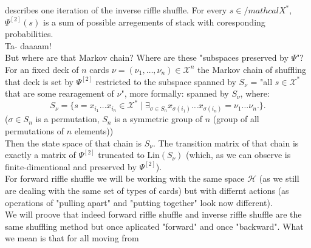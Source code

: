 \documentclass[a4paper]{article}
\begin{document}
describes one iteration of the inverse riffle shuffle. For every $s \in /mathcal{X}^*$, $\Psi^{[2]}(s)$ is 
a sum of possible arregements of stack with coresponding probabilities. \\ Ta- daaaam! \\[4pt]
But where are that Markov chain? Where are these "subspaces preserved by $\Psi$"? \\
For an fixed deck of $n$ cards $\nu = (\nu_1, \dots, \nu_n) \in \mathcal{X}^n$ the Markov chain of shuffling 
that deck is set by $\Psi^{[2]}$ restricted to the subspace spanned by $S_\nu$ = "all $s \in \mathcal{X}^*$ 
that are some rearagement of $\nu$", more formally: spanned by $S_\nu$, where:
\begin{equation*}
S_\nu = \{ s = x_{i_1}\dots x_{i_n} \in \mathcal{X}^* \mid
\exists_{\sigma \in S_n} x_{\sigma(i_1)}\dots x_{\sigma(i_n)} = \nu_1\dots \nu_n. \}.
\end{equation*}
($\sigma \in S_n$ is a permutation, $S_n$ is a symmetric group of $n$ (group of 
all permutations of $n$ elements))\\
Then the state space of that chain is $S_\nu$. The transition matrix of that chain is exactly a matrix of 
$\Psi^{[2]}$ truncated to $\mathrm{Lin}(S_\nu)$ (which, as we can observe is finite-dimentional and 
preserved by $\Psi^{[2]}$). \\[4pt]
For forward riffle shuffle we will be working with the same space $\mathcal{H}$ (as we still 
are dealing with the same set of types of cards) but with differnt actions (as operations of "pulling apart" 
and "putting together" look now different). \\
We will proove that indeed forward riffle shuffle and inverse riffle shuffle are the same shuffling method 
but once aplicated "forward" and once "backward". What we mean is that for all moving from 
{}

\end{document}
